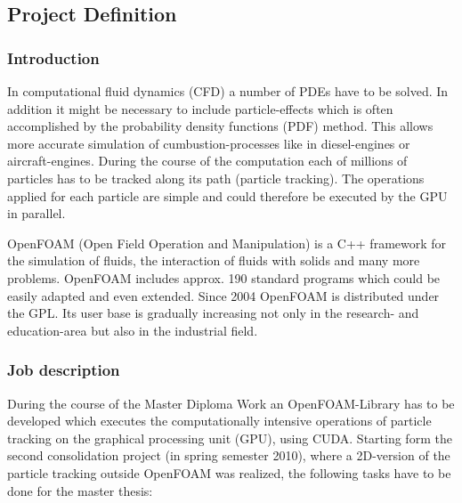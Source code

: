 \subsection{Project Definition}
\label{sec:projectDef}

\subsubsection*{Introduction}

In computational fluid dynamics (CFD) a number of PDEs have to be solved. In addition it might be necessary to include particle-effects which is often accomplished by the probability density functions (PDF) method. This allows more accurate simulation of cumbustion-processes like in diesel-engines or aircraft-engines. During the course of the computation each of millions of particles has to be tracked along its path (particle tracking). The operations applied for each particle are simple and could
therefore be executed by the GPU in parallel.

OpenFOAM (Open Field Operation and Manipulation) is a C++ framework for the simulation of fluids, the interaction of fluids with solids and many more problems. OpenFOAM includes approx. 190 standard programs which could be easily adapted and even extended.
Since 2004 OpenFOAM is distributed under the GPL. Its user base is gradually increasing not only in the research- and education-area but also in the industrial field.


\subsubsection*{Job description}

During the course of the Master Diploma Work an OpenFOAM-Library has to be developed which executes the computationally intensive operations of particle tracking on the graphical processing unit (GPU), using CUDA. Starting form the second consolidation project (in spring semester 2010), where a 2D-version of the particle tracking outside OpenFOAM was realized, the following tasks have to be done for the master thesis:

